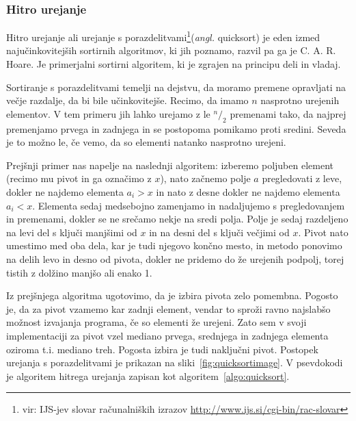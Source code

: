 \documentclass[a4paper,oneside,12pt]{article}
\begin{document}
\subsubsection{Hitro urejanje}
\label{chapter:quicksort}
Hitro urejanje ali urejanje s porazdelitvami\footnote{vir: IJS-jev slovar računalniških izrazov
\url{http://www.ijs.si/cgi-bin/rac-slovar}}(\emph{angl.} quicksort) je eden izmed
najučinkovitejših sortirnih algoritmov, ki jih poznamo, razvil pa ga je C. A. R. Hoare.
Je primerjalni sortirni algoritem, ki je zgrajen na principu deli in vladaj.

Sortiranje s porazdelitvami temelji na dejstvu, da moramo premene opravljati na večje
razdalje, da bi bile učinkovitejše. Recimo, da imamo $n$ nasprotno urejenih elementov.
V tem primeru jih lahko urejamo z le $^n/_2$ premenami tako, da najprej premenjamo prvega
in zadnjega in se postopoma pomikamo proti sredini. Seveda je to možno le, če vemo, da so 
elementi natanko nasprotno urejeni.

Prejšnji primer nas napelje na naslednji algoritem: 
izberemo poljuben element (recimo mu pivot in ga označimo z $x$), nato začnemo 
polje $a$ pregledovati z leve, dokler ne najdemo elementa $a_i > x$ in nato z desne dokler ne 
najdemo elementa $a_i < x$. Elementa sedaj medsebojno zamenjamo in nadaljujemo s 
pregledovanjem in premenami, dokler se ne srečamo nekje na sredi polja.
Polje je sedaj razdeljeno na levi del s ključi manjšimi od $x$ in na desni del
s ključi večjimi od $x$. Pivot nato umestimo med oba dela, kar je tudi njegovo končno
mesto, in metodo ponovimo na delih levo in desno od pivota, dokler ne pridemo do že urejenih
podpolj, torej tistih z dolžino manjšo ali enako 1. 

Iz prejšnjega algoritma ugotovimo, da je izbira pivota zelo
pomembna. Pogosto je, da za pivot vzamemo kar zadnji element, vendar to sproži ravno
najslabšo možnost izvajanja programa, če so elementi že urejeni. Zato sem v svoji
implementaciji za pivot vzel mediano prvega, srednjega in zadnjega elementa oziroma t.i.
mediano treh. Pogosta izbira je tudi naključni pivot. Postopek urejanja s
porazdelitvami je prikazan na sliki~\ref{fig:quicksortimage}.
V psevdokodi je algoritem hitrega urejanja zapisan kot algoritem~\ref{algo:quicksort}.
\end{document}
